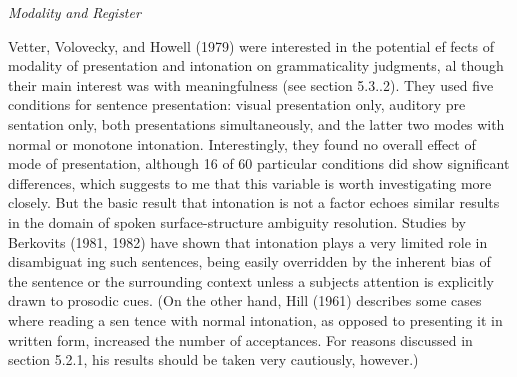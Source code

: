 \clearpage\setcounter{page}{1}\setcounter{listWWNumxxxileveli}{4}
\begin{listWWNumxxxileveli}
\item 
\setcounter{listWWNumxxxilevelii}{1}
\begin{listWWNumxxxilevelii}
\item 
\setcounter{listWWNumxxxileveliii}{4}
\begin{listWWNumxxxileveliii}
\item 
\begin{styleStandard}
\textit{Modality}\textit{ }\textit{and}\textit{ }\textit{Register}
\end{styleStandard}


\end{listWWNumxxxileveliii}
\end{listWWNumxxxilevelii}
\end{listWWNumxxxileveli}
\begin{styleTextbody}
Vetter, Volovecky, and Howell (1979) were interested in the potential ef\- fects of modality of presentation and intonation on grammaticality judgments, al\- though their main interest was with meaningfulness (see section 5.3.{\textquotesingle}.2). They used five conditions for sentence presentation: visual presentation only, auditory pre\- sentation only, both presentations simultaneously, and the latter two modes with normal or monotone intonation. Interestingly, they found no overall effect of mode of presentation, although 16 of 60 particular conditions did show significant differences, which suggests to me that this variable is worth investigating more closely. But the basic result that intonation is not a factor echoes similar results in the domain of spoken surface-structure ambiguity resolution. Studies by Berkovits (1981, 1982) have shown that intonation plays a very limited role in disambiguat\- ing such sentences, being easily overridden by the inherent bias of the sentence or the surrounding context unless a subject{\textquotesingle}s attention is explicitly drawn to prosodic cues. (On the other hand, Hill (1961) describes some cases where reading a sen\- tence with normal intonation, as opposed to presenting it in written form, increased the number of acceptances. For reasons discussed in section 5.2.1, his results should be taken very cautiously, however.)
\end{styleTextbody}


